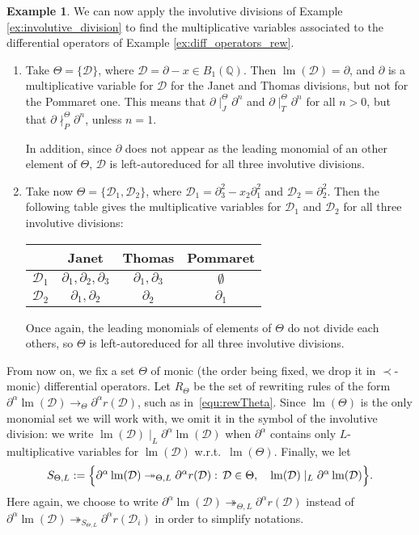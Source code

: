 \documentclass[10pt]{easychair}
\theoremstyle{definition}
\newtheorem{example}[theorem]{Example}
\newcommand\D{\mathcal{D}}
\DeclareMathOperator{\lm}{lm}
\newcommand\Q{\mathbb{Q}}
\newcommand\Weyl[1]{B_{#1}(\Q)}
\newcommand\rewTheta{\to_\Theta}
\newcommand\rewThetaS[1]{\twoheadrightarrow_{\Theta,#1}}
\newcommand\divInv[1]{\mid_{#1}}
\newcommand\RTheta{R_{\Theta}}
\newcommand\SThetaL{S_{\Theta,L}}
\begin{document}
\begin{example}\label{ex:multiplicative_variables}
  We can now apply the involutive divisions of Example
  \ref{ex:involutive_division} to find the multiplicative variables associated
  to the differential operators of Example \ref{ex:diff_operators_rew}.
  \begin{enumerate}
  \item Take $\Theta = \{\D\}$, where $\D = \partial - x \in \Weyl 1$. Then
    $\lm (\D) = \partial$, and $\partial$ is a multiplicative variable for $\D$ for the Janet
    and Thomas divisions, but not for the Pommaret one. This means that
    $\partial \divInv{J}^\Theta \partial^n$ and $\partial \divInv{T}^\Theta \partial^n$ for all
    $n > 0$, but that $\partial \nmid_P^\Theta \partial^n$, unless $n = 1$.

    In addition, since $\partial$ does not appear as the leading monomial of an other
    element of $\Theta$, $\D$ is left-autoreduced for all three involutive divisions.
  \item Take now $\Theta = \{\D_1,\D_2\}$, where
    $\D_1 = \partial_3^2 - x_2\partial_1^2$ and $\D_2 = \partial_2^2$. Then the following table gives
    the multiplicative variables for $\D_1$ and $\D_2$ for all three involutive divisions:
    \begin{center}
    \begin{tabular}{l|ccc}
      & Janet & Thomas & Pommaret \\ \hline
      $\D_1$ & $\partial_1, \partial_2, \partial_3$ & $\partial_1, \partial_3$ & $\emptyset$ \\
      $\D_2$ & $\partial_1, \partial_2$ & $\partial_2$ & $\partial_1$ \\
    \end{tabular}
  \end{center}

  Once again, the leading monomials of elements of $\Theta$ do not divide each
  others, so $\Theta$ is left-autoreduced for all three involutive divisions.
  \end{enumerate}
\end{example}
\smallskip


From now on, we fix a set $\Theta$ of monic (the order being fixed, we
drop it in $\prec$-monic) differential operators. Let $\RTheta$  be the
set of rewriting rules of the form
$\partial^\alpha\lm(\D)\rewTheta\partial^\alpha r(\D)$, such as
in~\eqref{equ:rewTheta}. Since $\lm(\Theta)$ is the only monomial set we
will work with, we omit it in the symbol of the involutive division: we
write $\lm(\D)\divInv{L}\partial^\alpha\lm(\D)$ when $\partial^\alpha$
contains only $L$-multiplicative variables for $\lm(\D)$ w.r.t.\
$\lm(\Theta)$. Finally, we let
\begin{equation}\label{equ:S-strategy}
  \SThetaL:=\Big\{\partial^\alpha\lm(\D)\rewThetaS{L}\partial^\alpha
  r(\D) : \, \D\in\Theta,\quad\lm(\D)\divInv{L}\partial^\alpha\lm(\D)\Big\}.
  \smallskip
\end{equation}
Here again, we choose to write
$\partial^\alpha\lm(\D)\rewThetaS{L}\partial^\alpha r(\D)$ instead of
$\partial^\alpha\lm(\D)\twoheadrightarrow_{\SThetaL}\partial^\alpha
r(\D_i)$ in order to simplify notations.
\smallskip
\end{document}
